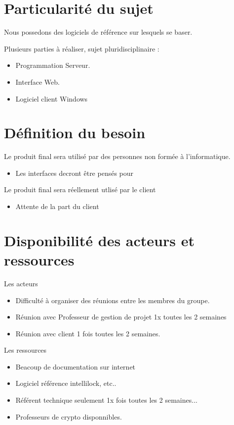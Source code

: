 \section{Particularité du sujet}
Nous possedons des logiciels de référence sur lesquels se baser.\\ \newline

Plusieurs parties à réaliser, sujet pluridisciplinaire :
\begin{itemize}
	\item Programmation Serveur.
	\item Interface Web.
	\item Logiciel client Windows
\end{itemize}

\section{Définition du besoin}
Le produit final sera utilisé par des personnes non formée à l'informatique. 
\begin{itemize}	
	\item Les interfaces decront être pensés pour\newline
\end{itemize}

Le produit final sera réellement utlisé par le client
\begin{itemize}
	\item Attente de la part du client
\end{itemize}

\section{Disponibilité des acteurs et ressources}
Les acteurs
\begin{itemize}
	\item Difficulté à organiser des réunions entre les membres du groupe.
	\item Réunion avec Professeur de gestion de projet 1x toutes les 2 semaines 
	\item Réunion avec client 1 fois toutes les 2 semaines.\newline
\end{itemize}

Les ressources
\begin{itemize}
	\item Beacoup de documentation sur internet
	\item Logiciel référence intellilock, etc..
	\item Référent technique seulement 1x fois toutes les 2 semaines...
	\item Professeurs de crypto disponnibles.\newline
\end{itemize}

